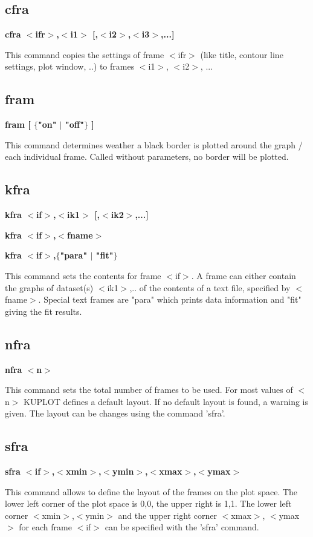 \subsection*{cfra}
{\bf cfra $ <$ifr$> $,$ <$i1$> $ [,$ <$i2$> $,$ <$i3$> $,...] \par }
\par
\vspace{3pt}
This command copies the settings of frame $ <$ifr$> $ (like title, contour 
line settings, plot window, ..) to frames $ <$i1$> $, $ <$i2$> $, ... 
\subsection*{fram}
{\bf fram [ $ \{$"on" $| $ "off"$\} $ ] \par }
\par
\vspace{3pt}
This command determines weather a black border is plotted around the 
graph / each individual frame. Called without parameters, no border 
will be plotted. 
\subsection*{kfra}
{\bf kfra $ <$if$> $,$ <$ik1$> $ [,$ <$ik2$> $,...] \par }
{\bf kfra $ <$if$> $,$ <$fname$> $ \par }
{\bf kfra $ <$if$> $,$ \{$"para" $| $ "fit"$\} $ \par }
\par
\vspace{3pt}
This command sets the contents for frame $ <$if$> $. A frame can either 
contain the graphs of dataset(s) $ <$ik1$> $,.. of the contents of a text 
file, specified by $ <$fname$> $. Special text frames are "para" which 
prints data information and "fit" giving the fit results. 
\subsection*{nfra}
{\bf nfra $ <$n$> $ \par }
\par
\vspace{3pt}
This command sets the total number of frames to be used. For most 
values of $ <$n$> $ KUPLOT defines a default layout. If no default layout 
is found, a warning is given. The layout can be changes using the 
command 'sfra'. 
\subsection*{sfra}
{\bf sfra $ <$if$> $,$ <$xmin$> $,$ <$ymin$> $,$ <$xmax$> $,$ <$ymax$> $ \par }
\par
\vspace{3pt}
This command allows to define the layout of the frames on the plot space. 
The lower left corner of the plot space is 0,0, the upper right is 1,1. 
The lower left corner $ <$xmin$> $,$ <$ymin$> $ and the upper right corner $ <$xmax$> $, 
$ <$ymax$> $ for each frame $ <$if$> $ can be specified with the 'sfra' command. 
